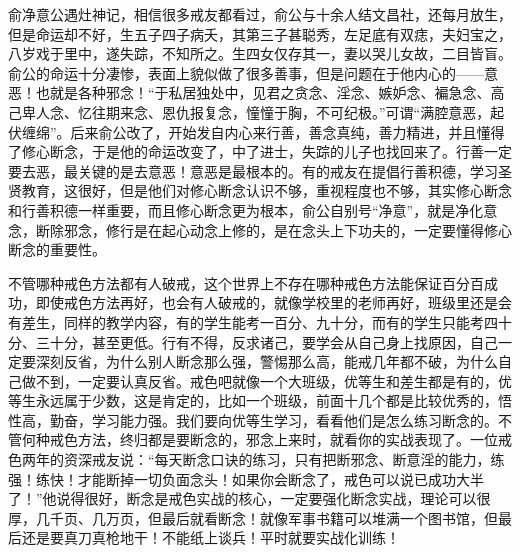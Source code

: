 俞净意公遇灶神记，相信很多戒友都看过，俞公与十余人结文昌社，还每月放生，但是命运却不好，生五子四子病夭，其第三子甚聪秀，左足底有双痣，夫妇宝之，八岁戏于里中，遂失踪，不知所之。生四女仅存其一，妻以哭儿女故，二目皆盲。俞公的命运十分凄惨，表面上貌似做了很多善事，但是问题在于他内心的——意恶！也就是各种邪念！“于私居独处中，见君之贪念、淫念、嫉妒念、褊急念、高己卑人念、忆往期来念、恩仇报复念，憧憧于胸，不可纪极。”可谓“满腔意恶，起伏缠绵”。后来俞公改了，开始发自内心来行善，善念真纯，善力精进，并且懂得了修心断念，于是他的命运改变了，中了进士，失踪的儿子也找回来了。行善一定要去恶，最关键的是去意恶！意恶是最根本的。有的戒友在提倡行善积德，学习圣贤教育，这很好，但是他们对修心断念认识不够，重视程度也不够，其实修心断念和行善积德一样重要，而且修心断念更为根本，俞公自别号“净意”，就是净化意念，断除邪念，修行是在起心动念上修的，是在念头上下功夫的，一定要懂得修心断念的重要性。

不管哪种戒色方法都有人破戒，这个世界上不存在哪种戒色方法能保证百分百成功，即使戒色方法再好，也会有人破戒的，就像学校里的老师再好，班级里还是会有差生，同样的教学内容，有的学生能考一百分、九十分，而有的学生只能考四十分、三十分，甚至更低。行有不得，反求诸己，要学会从自己身上找原因，自己一定要深刻反省，为什么别人断念那么强，警惕那么高，能戒几年都不破，为什么自己做不到，一定要认真反省。戒色吧就像一个大班级，优等生和差生都是有的，优等生永远属于少数，这是肯定的，比如一个班级，前面十几个都是比较优秀的，悟性高，勤奋，学习能力强。我们要向优等生学习，看看他们是怎么练习断念的。不管何种戒色方法，终归都是要断念的，邪念上来时，就看你的实战表现了。一位戒色两年的资深戒友说：“每天断念口诀的练习，只有把断邪念、断意淫的能力，练强！练快！才能断掉一切负面念头！如果你会断念了，戒色可以说已成功大半了！”他说得很好，断念是戒色实战的核心，一定要强化断念实战，理论可以很厚，几千页、几万页，但最后就看断念！就像军事书籍可以堆满一个图书馆，但最后还是要真刀真枪地干！不能纸上谈兵！平时就要实战化训练！

